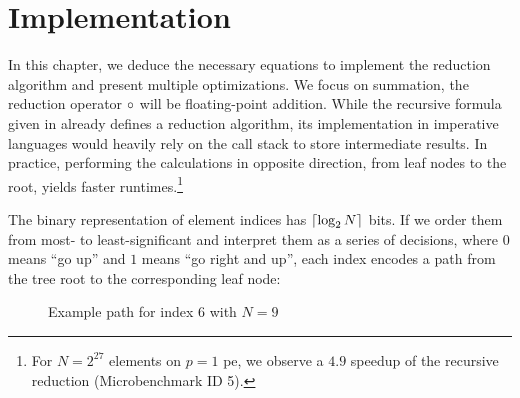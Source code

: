 \chapter{Implementation}
\label{ch:Implementation}

In this chapter, we deduce the necessary equations to implement the reduction algorithm and present multiple optimizations.
We focus on summation, the reduction operator $\operatorname{\circ}$ will be floating-point addition.
While the recursive formula given in  already defines a reduction algorithm, its implementation in imperative languages would heavily rely on the call stack to store intermediate results.
In practice, performing the calculations in opposite direction, from leaf nodes to the root, yields faster runtimes.\footnote{For $N=2^27$ elements on $p=1$ \gls{pe}, we observe a $4.9$ speedup of the recursive reduction (Microbenchmark ID 5).}

The binary representation of element indices has $\lceil \log_2 N \rceil$ bits.
If we order them from most- to least-significant and interpret them as a series of decisions, where $0$ means \enquote{go up} and $1$ means \enquote{go right and up}, each index encodes a path from the tree root to the corresponding leaf node:

\begin{figure}[H]
\centering
{}
\caption{Example path for index $6$ with $N = 9$}
\label{fig:indexTreePath}
\end{figure}

